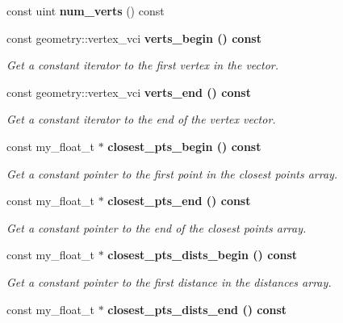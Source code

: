 \begin{CompactItemize}
\item 
const uint \textbf{num\_\-verts} () const \label{classASCbase_1_1model__hbond__surf__t_7a0344de6eb971227cf37c96b0b11606}

\item 
const geometry::vertex\_\-vci \bf{verts\_\-begin} () const \label{classASCbase_1_1model__hbond__surf__t_fad5a5374d17a84192f1f8fc74ea8876}

\begin{CompactList}\small\item\em Get a constant iterator to the first vertex in the vector. \item\end{CompactList}\item 
const geometry::vertex\_\-vci \bf{verts\_\-end} () const \label{classASCbase_1_1model__hbond__surf__t_50ec409886843895685f8549707ba15e}

\begin{CompactList}\small\item\em Get a constant iterator to the end of the vertex vector. \item\end{CompactList}\item 
const my\_\-float\_\-t $\ast$ \bf{closest\_\-pts\_\-begin} () const \label{classASCbase_1_1model__hbond__surf__t_d97fb2ca02976980a4c1e78b46b0df63}

\begin{CompactList}\small\item\em Get a constant pointer to the first point in the closest points array. \item\end{CompactList}\item 
const my\_\-float\_\-t $\ast$ \bf{closest\_\-pts\_\-end} () const \label{classASCbase_1_1model__hbond__surf__t_dd599b65e329040ffdaea701a3acbaeb}

\begin{CompactList}\small\item\em Get a constant pointer to the end of the closest points array. \item\end{CompactList}\item 
const my\_\-float\_\-t $\ast$ \bf{closest\_\-pts\_\-dists\_\-begin} () const \label{classASCbase_1_1model__hbond__surf__t_05e5c2efb6bd80474c20a983c10324ff}

\begin{CompactList}\small\item\em Get a constant pointer to the first distance in the distances array. \item\end{CompactList}\item 
const my\_\-float\_\-t $\ast$ \bf{closest\_\-pts\_\-dists\_\-end} () const \label{classASCbase_1_1model__hbond__surf__t_a0183e08be99f865caa5c59f0441529f}


\end{CompactItemize}

